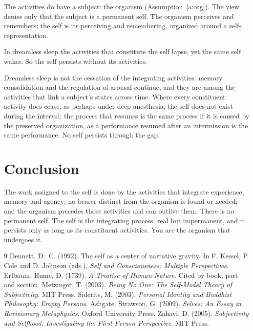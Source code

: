\documentclass{situationist-preprint}
\begin{document}
\begin{reply}
The activities do have a subject: the organism (Assumption~\ref{a:org}). The view denies only that the subject is a permanent self. The organism perceives and remembers; the self is its perceiving and remembering, organized around a self-representation.
\end{reply}

\begin{objection}[Sleep]
In dreamless sleep the activities that constitute the self lapse, yet the same self wakes. So the self persists without its activities.
\end{objection}

\begin{reply}
Dreamless sleep is not the cessation of the integrating activities: memory consolidation and the regulation of arousal continue, and they are among the activities that link a subject's states across time. Where every constituent activity does cease, as perhaps under deep anesthesia, the self does not exist during the interval; the process that resumes is the same process if it is caused by the preserved organization, as a performance resumed after an intermission is the same performance. No self persists through the gap.
\end{reply}

\section{Conclusion}

The work assigned to the self is done by the activities that integrate experience, memory and agency; no bearer distinct from the organism is found or needed; and the organism precedes those activities and can outlive them. There is no permanent self. The self is the integrating process, real but impermanent, and it persists only as long as its constituent activities. You are the organism that undergoes it.

\begin{thebibliography}{9}\small
{} Dennett, D.~C. (1992). The self as a center of narrative gravity. In F. Kessel, P. Cole and D. Johnson (eds.), \emph{Self and Consciousness: Multiple Perspectives}. Erlbaum.
 Hume, D. (1739). \emph{A Treatise of Human Nature}. Cited by book, part and section.
 Metzinger, T. (2003). \emph{Being No One: The Self-Model Theory of Subjectivity}. MIT Press.
 Siderits, M. (2003). \emph{Personal Identity and Buddhist Philosophy: Empty Persons}. Ashgate.
 Strawson, G. (2009). \emph{Selves: An Essay in Revisionary Metaphysics}. Oxford University Press.
 Zahavi, D. (2005). \emph{Subjectivity and Selfhood: Investigating the First-Person Perspective}. MIT Press.
\end{thebibliography}
\end{document}
